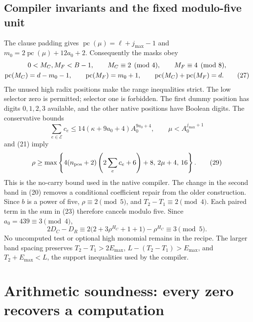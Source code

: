 \documentclass[11pt,a4paper]{article}
\theoremstyle{definition}
\theoremstyle{remark}
\newcommand{\pc}{\operatorname{pc}}
\begin{document}
\subsection{Compiler invariants and the fixed modulo-five unit}
The clause padding gives
\(\pc(\mu)=\ell+j_{\max}-1\) and
\(m_0=2\pc(\mu)+12a_0+2\).
Consequently the masks obey
\begin{gather}
 0<M_C,M_F<B-1,\qquad
 M_C\equiv2\pmod4,\qquad M_F\equiv4\pmod8,\notag\\
 \pc(M_C)=d-m_0-1,\qquad
 \pc(M_F)=m_0+1,\qquad
 \pc(M_C)+\pc(M_F)=d. \tag{27}\label{eq:maskproperties}
\end{gather}
The unused high radix positions make the range inequalities strict.
The low selector zero is permitted; selector one is forbidden.
The first dummy position has digits \(0,1,2,3\) available, and the other
native positions have Boolean digits.
The conservative bounds
\[
 \sum_{e\in\mathcal E}c_e
    \le14(\kappa+9a_0+4)A_0^{9a_0+4},
 \qquad \mu<A_0^{j_{\max}+1}
 \tag{28}
\]
and (21) imply
\[
 \rho\ge
 \max\left\{
 4(n_{\rm pos}+2)\left(2\sum_e c_e+6\right)+8,\,
 2\mu+4,\,16\right\}. \tag{29}\label{eq:mass}
\]
This is the no-carry bound used in the native compiler.
The change in the second band in (20) removes a conditional coefficient
repair from the older construction. Since \(b\) is a power of five,
\(\rho\equiv2\pmod5\), and
\(T_2-T_1\equiv2\pmod4\). Each paired term in the sum in (23)
therefore cancels modulo five. Since \(a_0=439\equiv3\pmod4\),
\[
 2D_C-D_R
 \equiv2\bigl(2+3\rho^{H_C}+1+1\bigr)-\rho^{H_C}
 \equiv3\pmod5. \tag{30}\label{eq:unit5}
\]
No uncomputed test or optional high monomial remains in the recipe.
The larger band spacing preserves
\(T_2-T_1>2E_{\max}\), \(L-(T_2-T_1)>E_{\max}\), and
\(T_2+E_{\max}<L\), the support inequalities used by the compiler.

\section{Arithmetic soundness: every zero recovers a computation}
\end{document}
